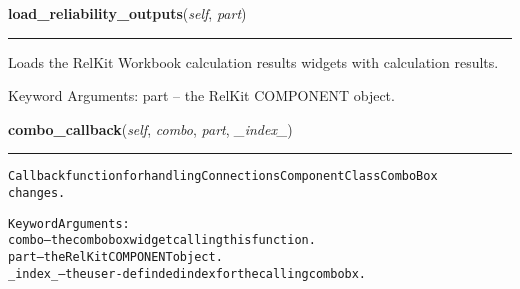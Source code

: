     \vspace{0.5ex}

\hspace{.8\funcindent}\begin{boxedminipage}{\funcwidth}

    \raggedright \textbf{load\_reliability\_outputs}(\textit{self}, \textit{part})

    \vspace{-1.5ex}

    \rule{\textwidth}{0.5\fboxrule}
\setlength{\parskip}{2ex}
    Loads the RelKit Workbook calculation results widgets with 
    calculation results.

    Keyword Arguments: part -- the RelKit COMPONENT object.

\setlength{\parskip}{1ex}
    \end{boxedminipage}

    \label{reliafree:connections:connection:Connection:combo_callback}

    \vspace{0.5ex}

\hspace{.8\funcindent}\begin{boxedminipage}{\funcwidth}

    \raggedright \textbf{combo\_callback}(\textit{self}, \textit{combo}, \textit{part}, \textit{\_index\_})

    \vspace{-1.5ex}

    \rule{\textwidth}{0.5\fboxrule}
\setlength{\parskip}{2ex}
\begin{alltt}
Callback function for handling Connections Component Class ComboBox
changes.

Keyword Arguments:
  combo -- the combobox widget calling this function.
   part -- the RelKit COMPONENT object.
\_index\_ -- the user-definded index for the calling combobx.
\end{alltt}

\setlength{\parskip}{1ex}
    \end{boxedminipage}

    \label{reliafree:connections:connection:Connection:entry_callback}

